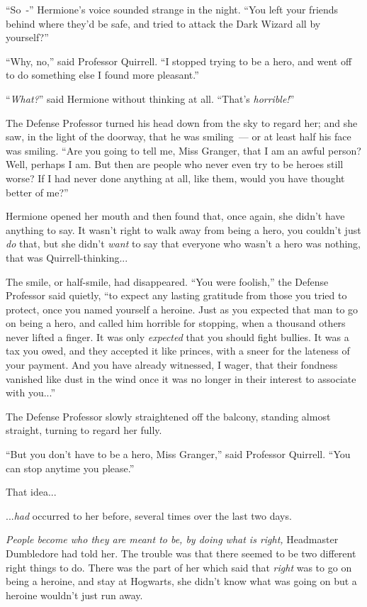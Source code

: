 ``So~-'' Hermione's voice sounded strange in the night. ``You left your friends behind where they'd be safe, and tried to attack the Dark Wizard all by yourself?''

``Why, no,'' said Professor Quirrell. ``I stopped trying to be a hero, and went off to do something else I found more pleasant.''

``\emph{What?}'' said Hermione without thinking at all. ``That's \emph{horrible!}''

The Defense Professor turned his head down from the sky to regard her; and she saw, in the light of the doorway, that he was smiling~--- or at least half his face was smiling. ``Are you going to tell me, Miss Granger, that I am an awful person? Well, perhaps I am. But then are people who never even try to be heroes still worse? If I had never done anything at all, like them, would you have thought better of me?''

Hermione opened her mouth and then found that, once again, she didn't have anything to say. It wasn't right to walk away from being a hero, you couldn't just \emph{do} that, but she didn't \emph{want} to say that everyone who wasn't a hero was nothing, that was Quirrell-thinking...

The smile, or half-smile, had disappeared. ``You were foolish,'' the Defense Professor said quietly, ``to expect any lasting gratitude from those you tried to protect, once you named yourself a heroine. Just as you expected that man to go on being a hero, and called him horrible for stopping, when a thousand others never lifted a finger. It was only \emph{expected} that you should fight bullies. It was a tax you owed, and they accepted it like princes, with a sneer for the lateness of your payment. And you have already witnessed, I wager, that their fondness vanished like dust in the wind once it was no longer in their interest to associate with you...''

The Defense Professor slowly straightened off the balcony, standing almost straight, turning to regard her fully.

``But you don't have to be a hero, Miss Granger,'' said Professor Quirrell. ``You can stop anytime you please.''

That idea...

...\emph{had} occurred to her before, several times over the last two days.

\emph{People become who they are meant to be, by doing what is right,} Headmaster Dumbledore had told her. The trouble was that there seemed to be two different right things to do. There was the part of her which said that \emph{right} was to go on being a heroine, and stay at Hogwarts, she didn't know what was going on but a heroine wouldn't just run away.

